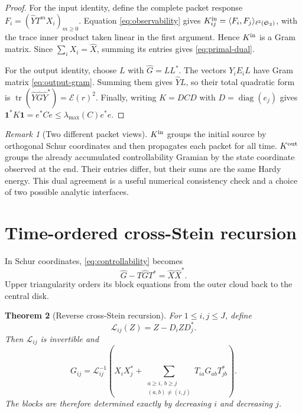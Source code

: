 \documentclass[11pt]{article}
\newtheorem{theorem}{Theorem}[section]
\theoremstyle{remark}
\newtheorem{remark}[theorem]{Remark}
\newcommand{\HS}{\mathfrak S_2}
\newcommand{\cE}{\mathcal E}
\newcommand{\tr}{\operatorname{tr}}
\begin{document}
\begin{proof}
For the input identity, define the complete packet response
$F_i=(\widehat YT^mX_i)_{m\ge0}$.  Equation \eqref{eq:observability} gives
$K^{\rm in}_{ij}=\langle F_i,F_j\rangle_{\ell^2(\HS)}$, with the trace
inner product taken linear in the first argument.  Hence $K^{\rm in}$ is a
Gram matrix.  Since $\sum_iX_i=\widehat X$, summing its entries gives
\eqref{eq:primal-dual}.

For the output identity, choose $L$ with $\widehat G=LL^*$.  The vectors
$Y_iE_iL$ have Gram matrix \eqref{eq:output-gram}.  Summing them gives
$\widehat YL$, so their total quadratic form is
$\tr(\widehat Y\widehat G\widehat Y^*)=\cE(r)^2$.
Finally, writing $K=DCD$ with $D=\operatorname{diag}(e_j)$ gives
$\mathbf1^*K\mathbf1=e^*Ce\le\lambda_{\max}(C)e^*e$.
\end{proof}

\begin{remark}[Two different packet views]
$K^{\rm in}$ groups the initial source by orthogonal Schur coordinates and
then propagates each packet for all time.  $K^{\rm out}$ groups the already
accumulated controllability Gramian by the state coordinate observed at the
end.  Their entries differ, but their sums are the same Hardy energy.  This
dual agreement is a useful numerical consistency check and a choice of two
possible analytic interfaces.
\end{remark}

\section{Time-ordered cross-Stein recursion}
\label{sec:recursion}

In Schur coordinates, \eqref{eq:controllability} becomes
\begin{equation}
 \widehat G-T\widehat GT^*=\widehat X\widehat X^*.
 \label{eq:schur-stein}
\end{equation}
Upper triangularity orders its block equations from the outer cloud back to
the central disk.

\begin{theorem}[Reverse cross-Stein recursion]
\label{thm:recursion}
For $1\le i,j\le J$, define
\begin{equation}
 \mathcal L_{ij}(Z)=Z-D_iZD_j^*.
 \label{eq:block-stein-operator}
\end{equation}
Then $\mathcal L_{ij}$ is invertible and
\begin{equation}
 \boxed{
 G_{ij}=\mathcal L_{ij}^{-1}\!\left(
 X_iX_j^*+
 \sum_{\substack{a\ge i,\ b\ge j\\(a,b)\ne(i,j)}}
 T_{ia}G_{ab}T_{jb}^*
 \right).}
 \label{eq:reverse-recursion}
\end{equation}
The blocks are therefore determined exactly by decreasing $i$ and decreasing
$j$.
\end{theorem}
\end{document}
